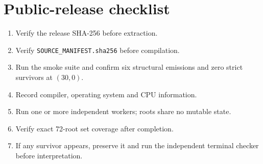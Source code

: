 \documentclass[11pt,a4paper]{article}
\theoremstyle{definition}\newtheorem{definition}[theorem]{Definition}
\theoremstyle{remark}\newtheorem{remark}[theorem]{Remark}
\newcommand{\code}[1]{\texttt{#1}}
\begin{document}
\section{Public-release checklist}
\begin{enumerate}
\item Verify the release SHA-256 before extraction.
\item Verify \code{SOURCE\_MANIFEST.sha256} before compilation.
\item Run the smoke suite and confirm six structural emissions and zero strict survivors at $(30,0)$.
\item Record compiler, operating system and CPU information.
\item Run one or more independent workers; roots share no mutable state.
\item Verify exact 72-root set coverage after completion.
\item If any survivor appears, preserve it and run the independent terminal checker before interpretation.
\end{enumerate}
\end{document}

